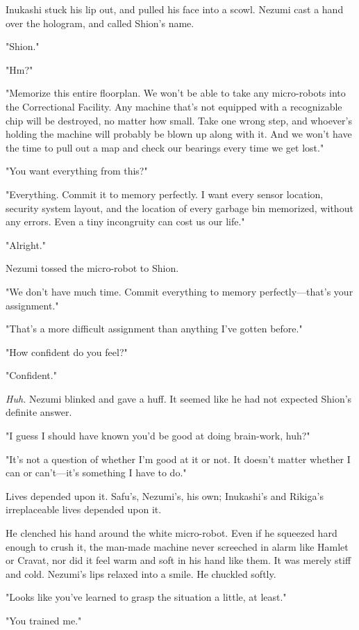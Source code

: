 Inukashi stuck his lip out, and pulled his face into a scowl. Nezumi
cast a hand over the hologram, and called Shion's name.

"Shion."

"Hm?"

"Memorize this entire floorplan. We won't be able to take any
micro-robots into the Correctional Facility. Any machine that's not
equipped with a recognizable chip will be destroyed, no matter how
small. Take one wrong step, and whoever's holding the machine will
probably be blown up along with it. And we won't have the time to pull
out a map and check our bearings every time we get lost."

"You want everything from this?"

"Everything. Commit it to memory perfectly. I want every sensor
location, security system layout, and the location of every garbage bin
memorized, without any errors. Even a tiny incongruity can cost us our
life."

"Alright."

Nezumi tossed the micro-robot to Shion.

"We don't have much time. Commit everything to memory perfectly---that's
your assignment."

"That's a more difficult assignment than anything I've gotten before."

"How confident do you feel?"

"Confident."

\emph{Huh.} Nezumi blinked and gave a huff. It seemed like he had not expected
Shion's definite answer.

"I guess I should have known you'd be good at doing brain-work, huh?"

"It's not a question of whether I'm good at it or not. It doesn't matter
whether I can or can't---it's something I have to do."

Lives depended upon it. Safu's, Nezumi's, his own; Inukashi's and
Rikiga's irreplaceable lives depended upon it.

He clenched his hand around the white micro-robot. Even if he squeezed
hard enough to crush it, the man-made machine never scree\-ched in alarm
like Hamlet or Cravat, nor did it feel warm and soft in his hand like
them. It was merely stiff and cold. Nezumi's lips relaxed into a smile.
He chuckled softly.

"Looks like you've learned to grasp the situation a little, at least."

"You trained me."

